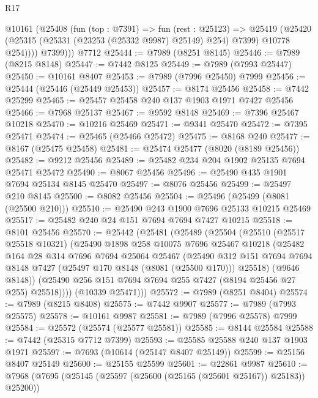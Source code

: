 \begin{lexlean}{R17}
\begin{coremodule}
        @10161
          (@25408
            (fun (top : @7391) =>
            fun (rest : @25123) =>
            @25419
              (@25420 (@25315 (@25331 (@23253 (@25332 @9987) @25149) @254) @7399) @10778 @254))))
          @7399)))
    @7712
@25444 := @7989 (@8251 @8145)
@25446 := @7989 (@8215 @8148)
@25447 := @7442 @8125
@25449 := @7989 (@7993 @25447)
@25450 := @10161 @8407
@25453 := @7989 (@7996 @25450) @7999
@25456 := @25444 (@25446 (@25449 @25453))
@25457 := @8174 @25456
@25458 := @7442 @25299
@25465 := @25457 @25458 @240 @137 @1903 @1971 @7427 @25456
@25466 := @7968 @25137
@25467 := @9592 @8148
@25469 := @7396 @25467 @10218
@25470 := @10216 @25469
@25471 := @9341 @25470
@25472 := @7395 @25471
@25474 := @25465 (@25466 @25472)
@25475 := @8168 @240
@25477 := @8167 (@25475 @25458)
@25481 := @25474 @25477 (@8020 (@8189 @25456))
@25482 := @9212 @25456
@25489 := @25482 @234 @204 @1902 @25135 @7694 @25471 @25472
@25490 := @8067 @25456
@25496 := @25490 @435 @1901 @7694 @25134 @8145 @25470
@25497 := @8076 @25456
@25499 := @25497 @210 @8145
@25500 := @8082 @25456
@25504 := @25496 (@25499 (@8081 (@25500 @210)))
@25510 := @25490 @243 @1900 @7696 @25133 @10215 @25469
@25517 := @25482 @240 @24 @151 @7694 @7694 @7427 @10215
@25518 := @8101 @25456
@25570 := @25442
    (@25481
      (@25489
        (@25504
          (@25510
            (@25517 @25518 @10321)
            (@25490
              @1898
              @258
              @10075
              @7696
              @25467
              @10218
              (@25482
                @164
                @28
                @314
                @7696
                @7694
                @25064
                @25467
                (@25490
                  @312
                  @151
                  @7694
                  @7694
                  @8148
                  @7427
                  (@25497 @170 @8148 (@8081 (@25500 @170)))
                  @25518)
                (@9646 @8148))
              (@25490 @256 @151 @7694 @7694 @255 @7427 (@8194 @25456 @27 @255) @25518))))
        (@10339 @25471)))
@25572 := @7989 (@8251 @8404)
@25574 := @7989 (@8215 @8408)
@25575 := @7442 @9907
@25577 := @7989 (@7993 @25575)
@25578 := @10161 @9987
@25581 := @7989 (@7996 @25578) @7999
@25584 := @25572 (@25574 (@25577 @25581))
@25585 := @8144 @25584
@25588 := @7442 (@25315 @7712 @7399)
@25593 := @25585 @25588 @240 @137 @1903 @1971
@25597 := @7693 (@10614 (@25147 @8407 @25149))
@25599 := @25156 @8407 @25149
@25600 := @25155 @25599
@25601 := @22861 @9987
@25610 := @7968 (@7695 (@25145 (@25597 (@25600 (@25165 (@25601 @25167)) @25183)) @25200))

\end{coremodule}
\end{lexlean}
